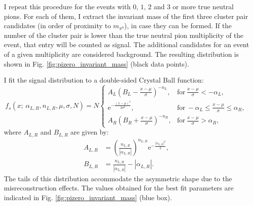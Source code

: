 I repeat this procedure for the events with $0$, $1$, $2$ and $3$ or more true neutral pions. For each of them, I extract the invariant mass of the first three cluster pair candidates (in order of proximity to $m_{\pi^{0}}$), in case they can be formed. If the number of the cluster pair is lower than the true neutral pion multiplicity of the event, that entry will be counted as signal. The additional candidates for an event of a given multiplicity are considered background. The resulting distribution is shown in Fig. \ref{fig:pizero_invariant_mass} (black data points).

I fit the signal distribution to a double-sided Crystal Ball function:
\begin{equation}
    f_{s} (x; ~\alpha_{L,R}, n_{L,R}, \mu, \sigma, N) = N \left\{
    \begin{array}{ll}
        A_{L} \left(B_{L} - \frac{x - \mu}{\sigma}\right)^{-n_{L}}, & \mathrm{for} \ \frac{x - \mu}{\sigma} < -\alpha_{L},\\
        \mathrm{e}^{-\frac{(x-\mu)^{2}}{2 \sigma^{2}}}, & \mathrm{for} \ -\alpha_{L} \leq \frac{x - \mu}{\sigma} \leq \alpha_{R},\\
        A_{R} \left(B_{R} + \frac{x - \mu}{\sigma}\right)^{-n_{R}}, & \mathrm{for} \ \frac{x - \mu}{\sigma} > \alpha_{R},
    \end{array}
    \right.
\end{equation}
where $A_{L,R}$ and $B_{L,R}$ are given by:
\begin{equation}
\begin{split}
    A_{L,R} &= \left(\frac{n_{L,R}}{|\alpha_{L,R}|}\right)^{n_{L,R}} \mathrm{e}^{-\frac{|\alpha_{L,R}|^{2}}{2}},\\
    B_{L,R} &= \frac{n_{L,R}}{|\alpha_{L,R}|}-|\alpha_{L,R}|.
\end{split}
\end{equation}
The tails of this distribution accommodate the asymmetric shape due to the misreconstruction effects. The values obtained for the best fit parameters are indicated in Fig. \ref{fig:pizero_invariant_mass} (blue box).

